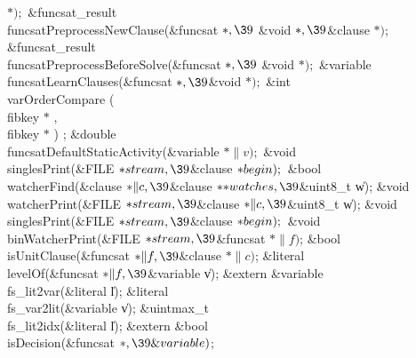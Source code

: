 {{{{{${}{*});{}$\6
\&{funcsat\_result} \\{funcsatPreprocessNewClause}(\&{funcsat} ${}{*},\39{}$%
\&{void} ${}{*},\39{}$\&{clause} ${}{*});{}$\6
\&{funcsat\_result} \\{funcsatPreprocessBeforeSolve}(\&{funcsat} ${}{*},\39{}$%
\&{void} ${}{*});{}$\6
\&{variable} \\{funcsatLearnClauses}(\&{funcsat} ${}{*},\39{}$\&{void}
${}{*});$ \&{int}  \\{varOrderCompare} ( \\{fibkey} $*$ $,$ \\{fibkey} $*$ )  ;%
\7
\&{double} \\{funcsatDefaultStaticActivity}(\&{variable} ${}{*}\|v);{}$\6
\&{void} \\{singlesPrint}(\&{FILE} ${}{*}\\{stream},\39{}$\&{clause} ${}{*}%
\\{begin});{}$\6
\&{bool} \\{watcherFind}(\&{clause} ${}{*}\|c,\39{}$\&{clause} ${}{*}{*}%
\\{watches},\39{}$\&{uint8\_t} \|w);\6
\&{void} \\{watcherPrint}(\&{FILE} ${}{*}\\{stream},\39{}$\&{clause} ${}{*}\|c,%
\39{}$\&{uint8\_t} \|w);\6
\&{void} \\{singlesPrint}(\&{FILE} ${}{*}\\{stream},\39{}$\&{clause} ${}{*}%
\\{begin});{}$\6
\&{void} \\{binWatcherPrint}(\&{FILE} ${}{*}\\{stream},\39{}$\&{funcsat} ${}{*}%
\|f){}$;\6
\&{bool} \\{isUnitClause}(\&{funcsat} ${}{*}\|f,\39{}$\&{clause} ${}{*}\|c){}$;%
\6
\&{literal} \\{levelOf}(\&{funcsat} ${}{*}\|f,\39{}$\&{variable} \|v);\6
\&{extern} \&{variable} \\{fs\_lit2var}(\&{literal} \|l);\6
\&{literal} \\{fs\_var2lit}(\&{variable} \|v);\6
\&{uintmax\_t} \\{fs\_lit2idx}(\&{literal} \|l);\6
\&{extern} \&{bool} \\{isDecision}(\&{funcsat} ${}{*},\39\&{variable}){}$;}}}}}
